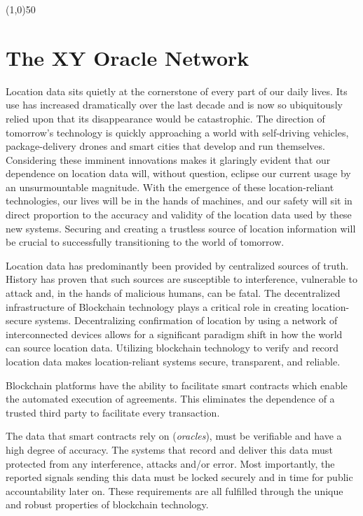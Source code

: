 \documentclass{article}
\begin{document}
\begin{center}
\line(1,0){50}
\end{center}

\section{The XY Oracle Network}

Location data sits quietly at the cornerstone of every part of our daily lives. Its use has increased dramatically over the last decade and is now so ubiquitously relied upon that its disappearance would be catastrophic. The direction of tomorrow's technology is quickly approaching a world with self-driving vehicles, package-delivery drones and smart cities that develop and run themselves. Considering these imminent innovations makes it glaringly evident that our dependence on location data will, without question, eclipse our current usage by an unsurmountable magnitude. With the emergence of these location-reliant technologies, our lives will be in the hands of machines, and our safety will sit in direct proportion to the \gls{accuracy} and validity of the location data used by these new systems. Securing and creating a \gls{trustless} source of location information will be crucial to successfully transitioning to the world of tomorrow.

Location data has predominantly been provided by centralized sources of truth. History has proven that such sources are susceptible to interference, vulnerable to attack and, in the hands of malicious humans, can be fatal. The decentralized infrastructure of Blockchain technology plays a critical role in creating location-secure systems. Decentralizing confirmation of location by using a network of interconnected devices allows for a significant paradigm shift in how the world can source location data. Utilizing blockchain technology to verify and record location data makes location-reliant systems secure, transparent, and reliable.

Blockchain platforms have the ability to facilitate smart contracts which enable the automated execution of agreements. This eliminates the dependence of a trusted third party to facilitate every transaction.

The data that smart contracts rely on (\textit{\glspl{oracle}}), must be verifiable and have a high degree of accuracy. The systems that record and deliver this data must protected from any interference, attacks and/or error. Most importantly, the reported signals sending this data must be locked securely and in time for public accountability later on. These requirements are all fulfilled through the unique and robust properties of blockchain technology.
\end{document}
